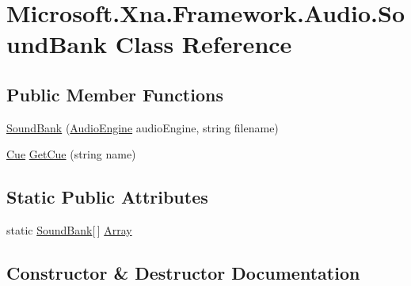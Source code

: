 \hypertarget{class_microsoft_1_1_xna_1_1_framework_1_1_audio_1_1_sound_bank}{}\section{Microsoft.\+Xna.\+Framework.\+Audio.\+Sound\+Bank Class Reference}
\label{class_microsoft_1_1_xna_1_1_framework_1_1_audio_1_1_sound_bank}
\subsection*{Public Member Functions}
\begin{DoxyCompactItemize}
\item 
\hyperlink{class_microsoft_1_1_xna_1_1_framework_1_1_audio_1_1_sound_bank_a7401d26ad444f026b44b1f75c114279a}{Sound\+Bank} (\hyperlink{class_microsoft_1_1_xna_1_1_framework_1_1_audio_1_1_audio_engine}{Audio\+Engine} audio\+Engine, string filename)
\item 
\hyperlink{class_microsoft_1_1_xna_1_1_framework_1_1_audio_1_1_cue}{Cue} \hyperlink{class_microsoft_1_1_xna_1_1_framework_1_1_audio_1_1_sound_bank_a80667a134461c87df27da9d72e050bd4}{Get\+Cue} (string name)
\end{DoxyCompactItemize}
\subsection*{Static Public Attributes}
\begin{DoxyCompactItemize}
\item 
static \hyperlink{class_microsoft_1_1_xna_1_1_framework_1_1_audio_1_1_sound_bank}{Sound\+Bank}\mbox{[}$\,$\mbox{]} \hyperlink{class_microsoft_1_1_xna_1_1_framework_1_1_audio_1_1_sound_bank_a610714aedb527ad104f6960d89b58205}{Array}
\end{DoxyCompactItemize}


\subsection{Constructor \& Destructor Documentation}
\hypertarget{class_microsoft_1_1_xna_1_1_framework_1_1_audio_1_1_sound_bank_a7401d26ad444f026b44b1f75c114279a}{}
